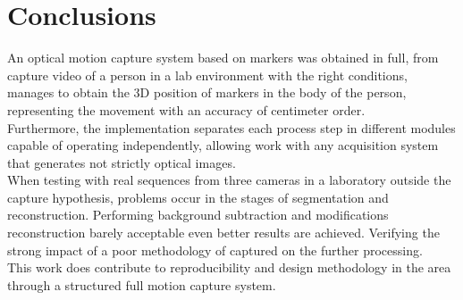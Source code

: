 \section{Conclusions}

An optical motion capture system based on markers was obtained in full,
from capture video of a person in a lab environment with the right conditions, manages to obtain the 3D position of markers in the body of the person, representing the movement with an accuracy of centimeter order.\\
\hspace*{0.5cm} Furthermore, the implementation separates each process step in different modules capable of operating independently, allowing work with any acquisition system that generates not strictly optical images.\\
\hspace*{0.5cm} When testing with real sequences from three cameras in a laboratory outside the capture hypothesis, problems occur in the stages of segmentation and reconstruction. Performing background subtraction and modifications reconstruction barely acceptable even better results are achieved. Verifying the strong impact of a poor methodology of captured on the further processing.\\
\hspace*{0.5cm}This work does contribute to reproducibility and design methodology in the area through a structured full motion capture system.
